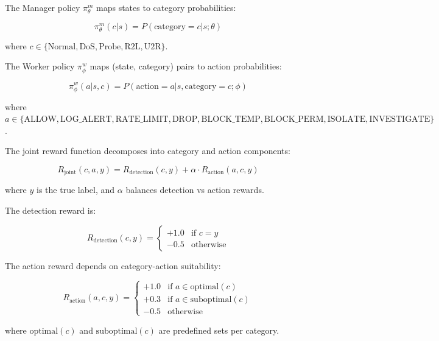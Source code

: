 \documentclass[conference]{IEEEtran}
\begin{document}
The Manager policy $\pi_\theta^m$ maps states to category probabilities:

\begin{equation}
\pi_\theta^m(c | s) = P(\text{category} = c | s; \theta)
\end{equation}

where $c \in \{\text{Normal}, \text{DoS}, \text{Probe}, \text{R2L}, \text{U2R}\}$.

The Worker policy $\pi_\phi^w$ maps (state, category) pairs to action probabilities:

\begin{equation}
\pi_\phi^w(a | s, c) = P(\text{action} = a | s, \text{category}=c; \phi)
\end{equation}

where $a \in \{\text{ALLOW}, \text{LOG\_ALERT}, \text{RATE\_LIMIT}, \text{DROP}, \text{BLOCK\_TEMP}, \text{BLOCK\_PERM}, \text{ISOLATE}, \text{INVESTIGATE}\}$.

The joint reward function decomposes into category and action components:

\begin{equation}
R_{\text{joint}}(c, a, y) = R_{\text{detection}}(c, y) + \alpha \cdot R_{\text{action}}(a, c, y)
\end{equation}

where $y$ is the true label, and $\alpha$ balances detection vs action rewards.

The detection reward is:

\begin{equation}
R_{\text{detection}}(c, y) = \begin{cases}
+1.0 & \text{if } c = y \\
-0.5 & \text{otherwise}
\end{cases}
\end{equation}

The action reward depends on category-action suitability:

\begin{equation}
R_{\text{action}}(a, c, y) = \begin{cases}
+1.0 & \text{if } a \in \text{optimal}(c) \\
+0.3 & \text{if } a \in \text{suboptimal}(c) \\
-0.5 & \text{otherwise}
\end{cases}
\end{equation}

where $\text{optimal}(c)$ and $\text{suboptimal}(c)$ are predefined sets per category.
\end{document}
